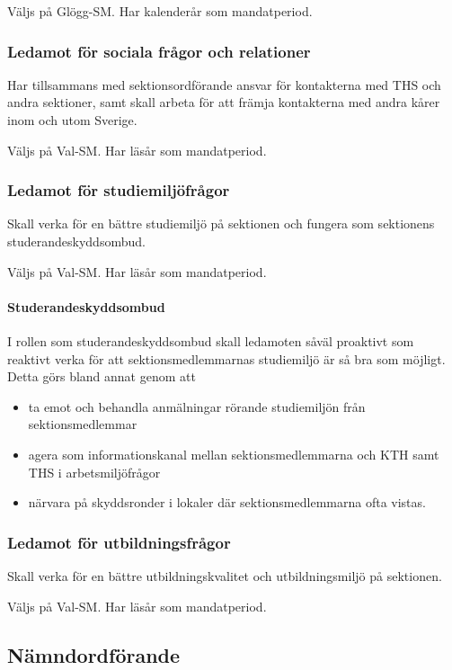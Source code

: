 \documentclass{dgovdoc}
\begin{document}
Väljs på Glögg-SM. Har kalenderår som mandatperiod.

\subsubsection{Ledamot för sociala frågor och relationer}

Har tillsammans med sektionsordförande ansvar för kontakterna med THS och andra
sektioner, samt skall arbeta för att främja kontakterna med andra kårer inom
och utom Sverige.

Väljs på Val-SM. Har läsår som mandatperiod.

\subsubsection{Ledamot för studiemiljöfrågor}

Skall verka för en bättre studiemiljö på sektionen och fungera som sektionens
studerandeskyddsombud.

Väljs på Val-SM. Har läsår som mandatperiod.

\paragraph{Studerandeskyddsombud}

I rollen som studerandeskyddsombud skall ledamoten såväl proaktivt som reaktivt
verka för att sektionsmedlemmarnas studiemiljö är så bra som möjligt. Detta
görs bland annat genom att

\begin{itemize}
  \item ta emot och behandla anmälningar rörande studiemiljön från
    sektionsmedlemmar
  \item agera som informationskanal mellan sektionsmedlemmarna och KTH samt THS
    i arbetsmiljöfrågor
  \item närvara på skyddsronder i lokaler där sektionsmedlemmarna ofta vistas.
\end{itemize}

\subsubsection{Ledamot för utbildningsfrågor}

Skall verka för en bättre utbildningskvalitet och utbildningsmiljö på
sektionen.

Väljs på Val-SM. Har läsår som mandatperiod.

\subsection{Nämndordförande}
\end{document}
